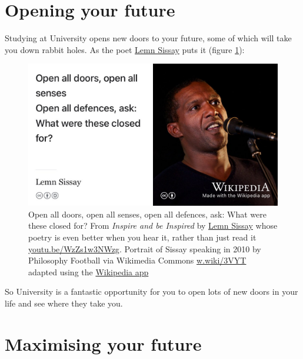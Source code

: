 \documentclass[
]{book}
\begin{document}
\hypertarget{opening}{%
\section{Opening your future}\label{opening}}

Studying at University opens new doors to your future, some of which will take you down rabbit holes. As the poet \href{https://en.wikipedia.org/wiki/Lemn_Sissay}{Lemn Sissay} puts it (figure \ref{fig:lemn-fig}):

\begin{figure}

{\centering \includegraphics[width=0.99\linewidth]{images/lemninspire} 

}

\caption{Open all doors, open all senses, open all defences, ask: What were these closed for? From \emph{Inspire and be Inspired} by \href{https://en.wikipedia.org/wiki/Lemn_Sissay}{Lemn Sissay} whose poetry is even better when you hear it, rather than just read it \href{https://youtu.be/WzZs1w3NWzg}{youtu.be/WzZs1w3NWzg}. \citep{sissay} Portrait of Sissay speaking in 2010 by Philosophy Football via Wikimedia Commons \href{https://w.wiki/3VYT}{w.wiki/3VYT} adapted using the \href{https://apps.apple.com/gb/app/wikipedia/id324715238}{Wikipedia app}}\label{fig:lemn-fig}
\end{figure}



So University is a fantastic opportunity for you to open lots of new doors in your life and see where they take you.

\hypertarget{roi}{%
\section{Maximising your future}\label{roi}}
\end{document}

